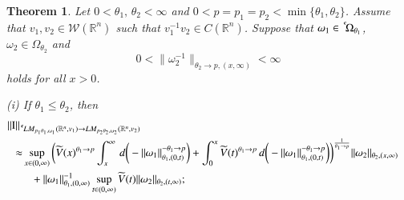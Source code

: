 \documentclass[11pt]{amsart}
\theoremstyle{plain}
\newtheorem{thm}{Theorem}[section]
\theoremstyle{definition}
\numberwithin{thm}{section}
\numberwithin{equation}{section}
\begin{document}
\begin{thm}\label{maintheorem4}
	Let $0 < {\theta}_1, \,{\theta}_2 < \infty$ and $0 < p = p_1 = p_2 < \min\{{\theta}_1,{\theta}_2\}$. Assume that $v_1, v_2\in {{\mathcal W}}({{\mathbb R}^n})$ such that $v_1^{-1}v_2 \in C({{\mathbb R}^n})$. Suppose that ${\omega}_1 \in {\,^{^{\bf c}}\!}{{\Omega}_{{\theta}_1}}$, ${\omega}_2\in {\Omega}_{{\theta}_2}$ and 
	$$
	0 < \|{\omega}_2^{-1}\|_{{\theta}_2 {\rightarrow} p, (x,\infty)} < \infty
	$$
	holds for all $x>0$.
	
	{\rm (i)} If ${\theta}_1 \le {\theta}_2$, then
	\begin{align*}
	\|{\operatorname{I}}\|_{{\,^{^{\bf c}}\!} LM_{p_1{\theta}_1,{\omega}_1}({{\mathbb R}^n},v_1){\rightarrow} LM_{p_2{\theta}_2,{\omega}_2}({{\mathbb R}^n},v_2)} \\ 
	& \hspace{-4cm} {\approx} \sup_{x\in (0,\infty)} \bigg( \widetilde{V}(x)^{{\theta}_1{\rightarrow} p} \int_x^{\infty} \, d \bigg(-\|{\omega}_1\|_{{\theta}_1,(0,t)}^{-{\theta}_1{\rightarrow} p}\bigg)  + \int_0^x  \widetilde{V}(t)^{{\theta}_1{\rightarrow} p} \, d\bigg(-\|{\omega}_1\|_{{\theta}_1,(0,t)}^{- {\theta}_1{\rightarrow} p}\bigg) \bigg) ^{{\frac{1}{{\theta}_1{\rightarrow} p}}}   \|{\omega}_2\|_{{\theta}_2,(x,\infty)} \\
	&\hspace{-3.5cm} +\|{\omega}_1\|_{{\theta}_1,(0,\infty)}^{-1} \sup_{t \in (0,{\infty})} \widetilde{V}(t) \|{\omega}_2\|_{{\theta}_2,(t,\infty)};
	\end{align*}
	

\end{thm}
\end{document}
